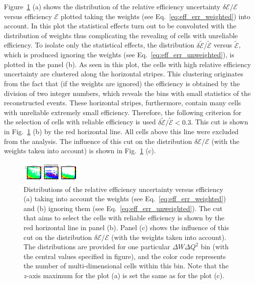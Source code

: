 Figure~\ref{fig:eff_err} (a) shows the distribution of the relative efficiency uncertainty $\delta \mathcal{E}/\mathcal{E}$ versus efficiency $\mathcal{E}$ plotted taking the weights (see Eq.~\eqref{eq:eff_err_weighted}) into account. In this plot the statistical effects turn out to be convoluted with the distribution of weights thus complicating the revealing of cells with unreliable efficiency. To isolate only the statistical effects, the distribution $\delta \widetilde{\mathcal{E}}/\widetilde{\mathcal{E}}$ versus $\widetilde{\mathcal{E}}$, which is produced ignoring the weights (see Eq.~\eqref{eq:eff_err_unweighted}), is plotted in the panel (b). As seen in this plot, the cells with high relative efficiency uncertainty are clustered along the horizontal stripes. This clustering originates from the fact that (if the weights are ignored) the efficiency is obtained by the division of two integer numbers, which reveals the bins with small statistics of the  reconstructed events. These horizontal stripes, furthermore, contain many cells with unreliable extremely small efficiency. Therefore, the following criterion for the selection of cells with reliable efficiency is used $\delta \widetilde{\mathcal{E}}/\widetilde{\mathcal{E}} < 0.3$. This cut is shown in Fig.~\ref{fig:eff_err} (b) by the red horizontal line. All cells above this line were excluded from the analysis. The influence of this cut on the distribution $\delta \mathcal{E}/\mathcal{E}$ (with the weights taken into account) is shown in Fig.~\ref{fig:eff_err} (c).


\begin{figure}[htp]
\begin{center}
\includegraphics[width=\textwidth]{pictures/cross_section/eff_err/eff_err_16375.pdf}
\caption{\small Distributions of the relative efficiency uncertainty versus efficiency (a) taking into account the weights (see Eq.~\eqref{eq:eff_err_weighted}) and (b) ignoring them (see Eq.~\eqref{eq:eff_err_unweighted}). The cut that aims to select the cells with reliable efficiency is shown by the red horizontal line in panel (b).  Panel (c) shows the influence of this cut on the distribution $\delta \mathcal{E}/\mathcal{E}$ (with the weights taken into account). The distributions are provided for one particular $\Delta W \Delta Q^2$ bin (with the central values specified in figure), and the color code represents the number of multi-dimensional cells within this bin. Note that the $z$-axis maximum for the plot (a) is set the same as for the plot (c).} \label{fig:eff_err}
\end{center}
\end{figure}



